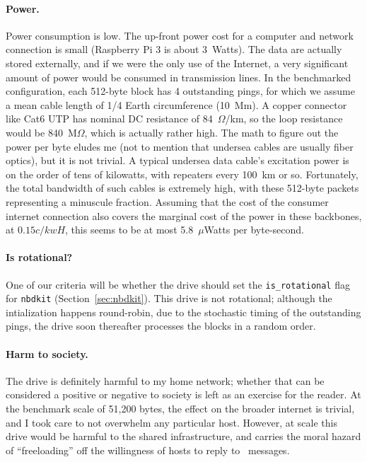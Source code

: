 \documentclass[twocolumn]{article}
\begin{document}
\paragraph{Power.} Power consumption is low. The up-front power cost for
a computer and network connection is small (Raspberry Pi 3 is about
3~Watts). The data are actually stored externally, and if we were the
only use of the Internet, a very significant amount of power would be
consumed in transmission lines. In the benchmarked configuration, each
512-byte block has 4 outstanding pings, for which we assume a mean
cable length of 1/4 Earth circumference (10~Mm). A copper connector
like Cat6 UTP has nominal DC resistance of 84~$\Omega$/km, so the loop
resistance would be 840~M$\Omega$, which is actually rather high. The
math to figure out the power per byte eludes me (not to mention that
undersea cables are usually fiber optics), but it is not trivial. A
typical undersea data cable's excitation power is on the order of tens
of kilowatts, with repeaters every 100~km or so. Fortunately, the
total bandwidth of such cables is extremely high, with these 512-byte
packets representing a minuscule fraction. Assuming that the cost of
the consumer internet connection also covers the marginal cost of the
power in these backbones, at $0.15c/kwH$, this seems to be at most
5.8~$\mu$Watts per byte-second.


\paragraph{Is rotational?} One of our criteria will be whether the
drive should set the \verb+is_rotational+ flag for {\tt nbdkit}
(Section~\ref{sec:nbdkit}). This drive is not rotational; although the
intialization happens round-robin, due to the stochastic timing of the
outstanding pings, the drive soon thereafter processes the blocks in a
random order.

\paragraph{Harm to society.} The drive is definitely harmful to my
home network; whether that can be considered a positive or negative to
society is left as an exercise for the reader. At the benchmark scale
of 51,200 bytes, the effect on the broader internet is trivial, and I
took care to not overwhelm any particular host. However, at scale
this drive would be harmful to the shared infrastructure, and
carries the moral hazard of ``freeloading'' off the willingness of
hosts to reply to \icmpecho\ messages.
\end{document}
